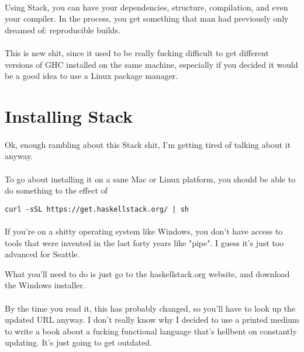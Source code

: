 \paragraph{}
Using Stack, you can have your dependencies, structure, compilation, and even your compiler.  In the process, you get something that man had previously only dreamed of: reproducible builds. 

\paragraph{}
This is new shit, since it used to be really fucking difficult to get different versions of GHC installed on the same machine, especially if you decided it would be a good idea to use a Linux package manager. 

\section {Installing Stack}

\paragraph{}
Ok, enough rambling about this Stack shit, I'm getting tired of talking about it anyway.  

\paragraph{}
To go about installing it on a sane Mac or Linux platform, you should be able to do something to the effect of 

\begin{verbatim}
curl -sSL https://get.haskellstack.org/ | sh
\end{verbatim}

\paragraph{}
If you're on a shitty operating system like Windows, you don't have access to tools that were invented in the last forty years like "pipe".  I guess it's just too advanced for Seattle. 

What you'll need to do is just go to the haskellstack.org website, and download the Windows installer. 

\paragraph{}
By the time you read it, this has probably changed, so you'll have to look up the updated URL anyway.  I don't really know why I decided to use a printed medium to write a book about a fucking functional language that's hellbent on constantly updating. It's just going to get outdated.


